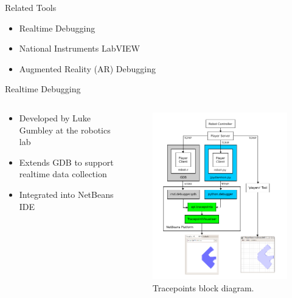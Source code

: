 \documentclass[compress]{beamer}
\begin{document}
\begin{frame}{Related Tools}
\begin{itemize}
\item Realtime Debugging \cite{Gumbley2009}
\item National Instruments LabVIEW
\item Augmented Reality (AR) Debugging \cite{Collett2010}
\end{itemize}
\end{frame}

\begin{frame}{Realtime Debugging}
\begin{columns}
\begin{column}{.5\textwidth}
\begin{itemize}
\item Developed by Luke Gumbley at the robotics lab
\item Extends GDB to support realtime data collection
\item Integrated into NetBeans IDE
\end{itemize}
\end{column}
\hfill%
\begin{column}{.5\textwidth}
\begin{figure}[htbp]
  \centering
  \includegraphics[width=.75\textwidth]{images/tracepoints_gumbley.png}
  \caption{Tracepoints block diagram. \cite{Gumbley2009}}
\end{figure}
\end{column}
\end{columns}
\end{frame}
\end{document}
